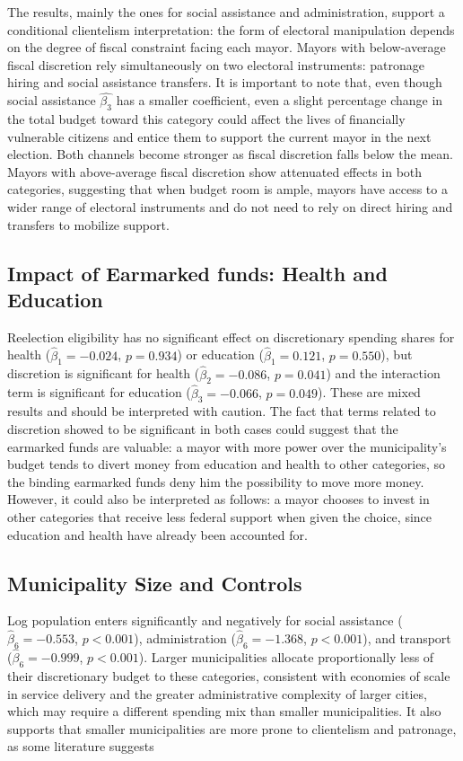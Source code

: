 \documentclass[12pt, a4paper]{article}
\begin{document}
The results, mainly the ones for social assistance and administration, support a conditional clientelism interpretation: the form of electoral manipulation depends on the degree of fiscal constraint facing each mayor. Mayors with below-average fiscal discretion rely simultaneously on two electoral instruments: patronage hiring and social assistance transfers. It is important to note that, even though social assistance $\hat{\beta_3}$ has a smaller coefficient, even a slight percentage change in the total budget toward this category could affect the lives of financially vulnerable citizens and entice them to support the current mayor in the next election. Both channels become stronger as fiscal discretion falls below the mean. Mayors with above-average fiscal discretion show attenuated effects in both categories, suggesting that when budget room is ample, mayors have access to a wider range of electoral instruments and do not need to rely on direct hiring and transfers to mobilize support.

\subsection*{Impact of Earmarked funds: Health and Education}

Reelection eligibility has no significant effect on discretionary spending shares for health ($\hat{\beta}_1 = -0.024$, $p = 0.934$) or education ($\hat{\beta}_1 = 0.121$, $p = 0.550$), but discretion is significant for health ($\hat{\beta}_2 = -0.086$, $p = 0.041$) and the interaction term is significant for education ($\hat{\beta}_3 = -0.066$, $p = 0.049$). These are mixed results and should be interpreted with caution. The fact that terms related to discretion showed to be significant in both cases could suggest that the earmarked funds are valuable: a mayor with more power over the municipality's budget tends to divert money from education and health to other categories, so the binding earmarked funds deny him the possibility to move more money. However, it could also be interpreted as follows: a mayor chooses to invest in other categories that receive less federal support when given the choice, since education and health have already been accounted for.

\subsection*{Municipality Size and Controls}

Log population enters significantly and negatively for social assistance ($\hat{\beta}_6 = -0.553$, $p < 0.001$), administration ($\hat{\beta}_6 = -1.368$, $p < 0.001$), and transport ($\hat{\beta}_6 = -0.999$, $p < 0.001$). Larger municipalities allocate proportionally less of their discretionary budget to these categories, consistent with economies of scale in service delivery and the greater administrative complexity of larger cities, which may require a different spending mix than smaller municipalities. It also supports that smaller municipalities are more prone to clientelism and patronage, as some literature suggests \cite{toral:2024} \cite{nicther:2018}
\end{document}
